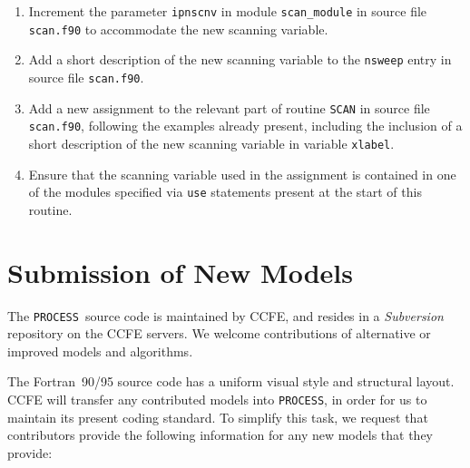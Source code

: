 \documentclass[11pt,a4paper]{report}
\newcommand{\process}{\mbox{\texttt{PROCESS}}}
\begin{document}
\begin{enumerate}

\item Increment the parameter \texttt{ipnscnv} in module \texttt{scan\_module}
  in source file \texttt{scan.f90} to accommodate the new scanning variable.

\item Add a short description of the new scanning variable to the
  \texttt{nsweep} entry in source file \texttt{scan.f90}.

\item Add a new assignment to the relevant part of routine \texttt{SCAN} in
  source file \texttt{scan.f90}, following the examples already present,
  including the inclusion of a short description of the new scanning variable
  in variable \texttt{xlabel}.

\item Ensure that the scanning variable used in the assignment is contained in
  one of the modules specified via \texttt{use} statements present at the
  start of this routine.

\end{enumerate}

\section{Submission of New Models}

The \process\ source code is maintained by CCFE, and resides in a
\textit{Subversion}~\cite{svn} repository on the CCFE servers. We welcome
contributions of alternative or improved models and algorithms.

The Fortran~90/95 source code has a uniform visual style and structural
layout. CCFE will transfer any contributed models into \process, in order for
us to maintain its present coding standard. To simplify this task, we request
that contributors provide the following information for any new models that
they provide:
\end{document}
